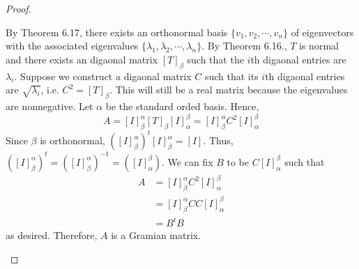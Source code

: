 \documentclass[11pt]{scrartcl}
\begin{document}
\begin{proof}
\begin{enumerate}[label=\roman*.]
{		      By Theorem 6.17, there exists an orthonormal basis $\{v_1, v_2, \cdots, v_n\}$ of eigenvectors with the associated
		      eigenvalues $\{\lambda_1, \lambda_2, \cdots, \lambda_n\}$. By Theorem 6.16., $T$ is normal and there exists
		      an digaonal matrix $[T]_\beta$ such that the $i$th digaonal entries are $\lambda_i$. Suppose we construct a digaonal
		      matrix $C$ such that its $i$th digaonal entries are $\sqrt{\lambda_i}$, i.e. $C^2 = [T]_\beta$. This will still be a real matrix because the
		      eigenvalues are nonnegative. Let $\alpha$ be the standard orded basis. Hence,
		      $$A = [I]_\beta^\alpha [T]_\beta [I]_\alpha^\beta = [I]_\beta^\alpha C^2 [I]_\alpha^\beta  $$
		      Since $\beta$ is orthonormal, $([I]_\beta^\alpha)^t [I]_\beta^\alpha  = [I]$.
		      Thus, $([I]_\beta^\alpha)^t = ([I]_\beta^\alpha)^{-1} = ([I]_\alpha^\beta)$.
		      We can fix $B$ to be $C[I]_\alpha^\beta$ such that
		      \begin{align*}
			      A & = [I]_\beta^\alpha C^2 [I]_\alpha^\beta \\
			        & = [I]_\beta^\alpha CC [I]_\alpha^\beta  \\
			        & = B^tB
		      \end{align*}
		      as desired. Therefore, $A$ is a Gramian matrix.
		      }
	\end{enumerate}
\end{proof}

\end{document}
